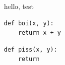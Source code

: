 \documentclass[11pt]{article}
\begin{document}
hello, test

\begin{verbatim}
def boi(x, y):
    return x + y
\end{verbatim}

\begin{verbatim}
def piss(x, y):
    return 
\end{verbatim}
\end{document}
